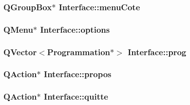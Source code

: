 \subsubsection[{menu\+Cote}]{\setlength{\rightskip}{0pt plus 5cm}Q\+Group\+Box$\ast$ Interface\+::menu\+Cote\hspace{0.3cm}{\ttfamily [private]}}\label{class_interface_a2f0340a091c08fb4d6c3357fbd156d21}
\hypertarget{class_interface_a5c22d42f0a82b546269f2265dc4020bf}{}
\subsubsection[{options}]{\setlength{\rightskip}{0pt plus 5cm}Q\+Menu$\ast$ Interface\+::options\hspace{0.3cm}{\ttfamily [private]}}\label{class_interface_a5c22d42f0a82b546269f2265dc4020bf}
\hypertarget{class_interface_a8c9a2e9fb9a19f879383fb160430c1b6}{}
\subsubsection[{prog}]{\setlength{\rightskip}{0pt plus 5cm}Q\+Vector$<${\bf Programmation}$\ast$$>$ Interface\+::prog\hspace{0.3cm}{\ttfamily [private]}}\label{class_interface_a8c9a2e9fb9a19f879383fb160430c1b6}
\hypertarget{class_interface_a2282b9ebbfc4d6b78aff0c4f09edf3ef}{}
\subsubsection[{propos}]{\setlength{\rightskip}{0pt plus 5cm}Q\+Action$\ast$ Interface\+::propos\hspace{0.3cm}{\ttfamily [private]}}\label{class_interface_a2282b9ebbfc4d6b78aff0c4f09edf3ef}
\hypertarget{class_interface_af2d5dd8a8ec08aca6ef98b14657b2d03}{}
\subsubsection[{quitte}]{\setlength{\rightskip}{0pt plus 5cm}Q\+Action$\ast$ Interface\+::quitte\hspace{0.3cm}{\ttfamily [private]}}\label{class_interface_af2d5dd8a8ec08aca6ef98b14657b2d03}
\hypertarget{class_interface_ac4ca6cf95990077c3c695f54b9340d46}{}
